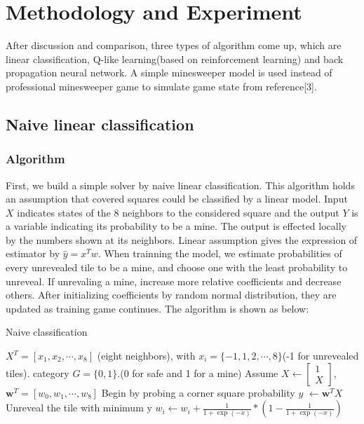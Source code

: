 \documentclass{article}
\begin{document}
\section{Methodology and Experiment}
After discussion and comparison, three types of algorithm come up, which are linear classification, Q-like learning(based on reinforcement learning) and back propagation neural network. A simple minesweeper model is used instead of professional minesweeper game to simulate game state from reference[3].
\subsection{Naive linear classification}
\subsubsection{Algorithm}
First, we build a simple solver by naive linear classification. This algorithm holds an assumption that covered squares could be classified by a linear model. Input $X$ indicates states of the 8 neighbors to the considered square and the output $Y$ is a variable indicating its probability to be a mine. The output is effected locally by the numbers shown at its neighbors. Linear assumption gives the expression of estimator by $\hat{y}=x^Tw$. When trainning the model, we estimate probabilities of every unrevealed tile to be a mine, and choose one with the least probability to unreveal. If unrevaling a mine, increase more relative coefficients and decrease others. After initializing coefficients by random normal distribution, they are updated as training game continues. The algorithm is shown as below:

\begin{algorithm}[htb] 
	\caption{Naive classification} 
	\label{alg:naive_classification} 
	\begin{algorithmic}[1]
		\Require $X^T = [x_1,x_2,\cdots,x_8]$ (eight neighbors),
			with $x_i = \{-1,1,2,\cdots,8\}$(-1 for unrevealed tiles).
		\Ensure category $G = \{0,1\}.$(0 for safe and 1 for a mine)\vspace{0.1in}
		\State Assume $X \leftarrow \begin{bmatrix} 1 \\ X \end{bmatrix}$, $\mathbf{w}^T = [w_0,w_1,\cdots,w_8]$
		\State Begin by probing a corner square
				\State probability $y$ $\leftarrow \mathbf{w}^TX$
			\EndFor
		\State Unreveal the tile with minimum y
		\EndWhile
		\State $w_i \leftarrow w_i + \frac{1}{1+\exp(-x)}*(1-\frac{1}{1+\exp(-x)})$
		\EndWhile
	\end{algorithmic} 
\end{algorithm}
\end{document}
